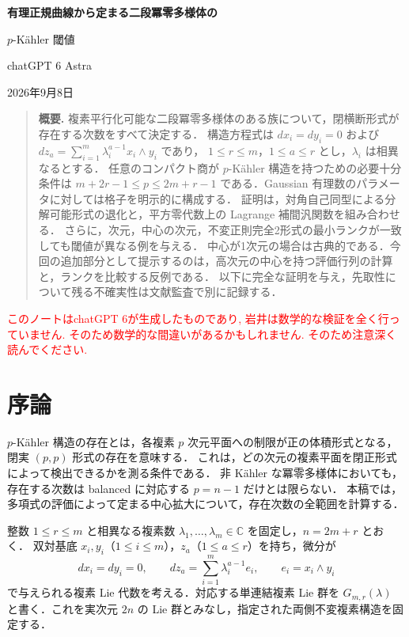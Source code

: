 \documentclass[12pt]{amsart}
\theoremstyle{definition}
\theoremstyle{remark}
\numberwithin{equation}{section}
\newcommand{\C}{\mathbb{C}}
\newcommand{\xr}[1]{\textcolor{red}{#1}}
\begin{document}
\newtheorem{jthm}[thm]{定理}
\newtheorem{jlem}[thm]{補題}
\newtheorem{jprop}[thm]{命題}
\theoremstyle{remark}
\newtheorem{jrem}[thm]{注意}
\renewcommand{\proofname}{証明}
\renewcommand{\refname}{参考文献}
\begin{center}
{\Large\bfseries 有理正規曲線から定まる二段冪零多様体の\par
$p$-K\"ahler 閾値}\par\medskip
chatGPT 6 Astra\par\smallskip
2026年9月8日
\end{center}
\begin{quotation}\small
\noindent\textbf{概要.}
複素平行化可能な二段冪零多様体のある族について，閉横断形式が存在する次数をすべて決定する．
構造方程式は $d x_i=d y_i=0$ および
$d z_a=\sum_{i=1}^m\lambda_i^{a-1}x_i\wedge y_i$ であり，
$1\leq r\leq m$，$1\leq a\leq r$ とし，$\lambda_i$ は相異なるとする．
任意のコンパクト商が $p$-K\"ahler 構造を持つための必要十分条件は
$m+2r-1\leq p\leq2m+r-1$ である．Gaussian 有理数のパラメータに対しては格子を明示的に構成する．
証明は，対角自己同型による分解可能形式の退化と，平方零代数上の Lagrange 補間汎関数を組み合わせる．
さらに，次元，中心の次元，不変正則完全2形式の最小ランクが一致しても閾値が異なる例を与える．
中心が1次元の場合は古典的である．今回の追加部分として提示するのは，高次元の中心を持つ評価行列の計算と，ランクを比較する反例である．
以下に完全な証明を与え，先取性について残る不確実性は文献監査で別に記録する．
\end{quotation}


\xr{このノートはchatGPT 6が生成したものであり, 岩井は数学的な検証を全く行っていません. そのため数学的な間違いがあるかもしれません. そのため注意深く読んでください.}

\section{序論}
$p$-K\"ahler 構造の存在とは，各複素 $p$ 次元平面への制限が正の体積形式となる，閉実 $(p,p)$ 形式の存在を意味する．
これは，どの次元の複素平面を閉正形式によって検出できるかを測る条件である．
非 K\"ahler な冪零多様体においても，存在する次数は balanced に対応する $p=n-1$ だけとは限らない．
本稿では，多項式の評価によって定まる中心拡大について，存在次数の全範囲を計算する．

整数 $1\leq r\leq m$ と相異なる複素数 $\lambda_1,\ldots,\lambda_m\in\C$ を固定し，$n=2m+r$ とおく．
双対基底 $x_i,y_i$（$1\leq i\leq m$），$z_a$（$1\leq a\leq r$）を持ち，微分が
\begin{equation}\label{ja:equations}
 d x_i=d y_i=0,\qquad
 d z_a=\sum_{i=1}^m\lambda_i^{a-1}e_i,\qquad e_i=x_i\wedge y_i
\end{equation}
で与えられる複素 Lie 代数を考える．対応する単連結複素 Lie 群を
$G_{m,r}(\lambda)$ と書く．これを実次元 $2n$ の Lie 群とみなし，指定された両側不変複素構造を固定する．
\end{document}
